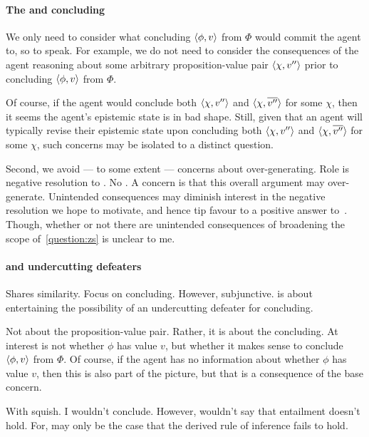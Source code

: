\paragraph{The \agpe{} and concluding}

\begin{note}
  We only need to consider what concluding \(\langle \phi, v \rangle\) from \(\Phi\) would commit the agent to, so to speak.
  For example, we do not need to consider the consequences of the agent reasoning about some arbitrary proposition-value pair \(\langle \chi, v'' \rangle\) prior to concluding \(\langle \phi, v \rangle\) from \(\Phi\).

  Of course, if the agent would conclude both \(\langle \chi, v'' \rangle\) and \(\langle \chi, \overline{v''} \rangle\) for some \(\chi\), then it seems the agent's epistemic state is in bad shape.
  Still, given that an agent will typically revise their epistemic state upon concluding both \(\langle \chi, v'' \rangle\) and \(\langle \chi, \overline{v''} \rangle\) for some \(\chi\), such concerns may be isolated to a distinct question.

  Second, we avoid --- to some extent --- concerns about over-generating.
  Role is negative resolution to \issueConstraint{}.
  No \wit{}.
  A concern is that this overall argument may over-generate.
  Unintended consequences may diminish interest in the negative resolution we hope to motivate, and hence tip favour to a positive answer to~\issueConstraint{}.
  Though, whether or not there are unintended consequences of broadening the scope of~\autoref{question:zs} is unclear to me.
\end{note}


\paragraph{ and undercutting defeaters}

\begin{note}
  Shares similarity.
  Focus on concluding.
  However, subjunctive.
  \qzS{} is about entertaining the possibility of an undercutting defeater for concluding.
\end{note}

\begin{note}
  Not about the proposition-value pair.
  Rather, it is about the concluding.
  At interest is not whether \(\phi\) has value \(v\), but whether it makes sense to conclude \(\langle \phi, v \rangle\) from \(\Phi\).
  Of course, if the agent has no information about whether \(\phi\) has value \(v\), then this is also part of the picture, but that is a consequence of the base concern.

  With squish.
  I wouldn't conclude.
  However, wouldn't say that entailment doesn't hold.
  For, may only be the case that the derived rule of inference fails to hold.
\end{note}

